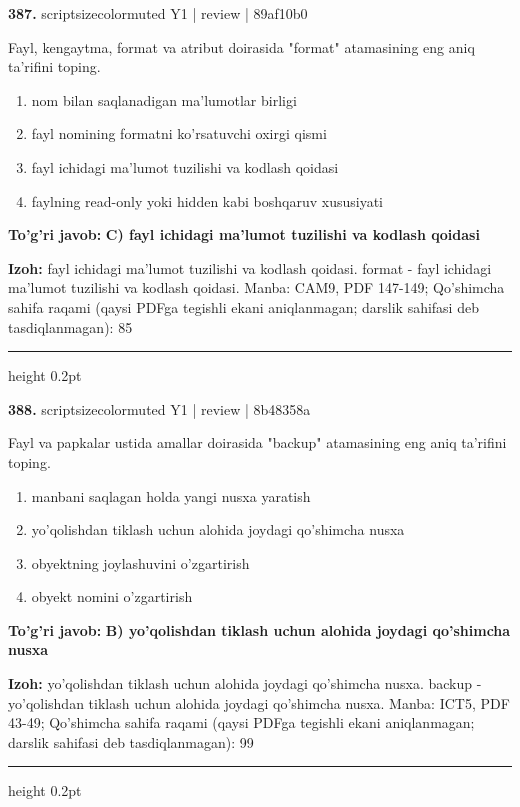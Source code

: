 \documentclass[10pt,a4paper]{article}
\begin{document}
{\bfseries\sffamily\color{ink} 387.} {scriptsizecolor{muted} Y1 | review | 89af10b0}
\par
Fayl, kengaytma, format va atribut doirasida "format" atamasining eng aniq ta'rifini toping.
\begin{enumerate}[label=\Alph*),leftmargin=9mm]
\item nom bilan saqlanadigan ma'lumotlar birligi
\item fayl nomining formatni ko'rsatuvchi oxirgi qismi
\item fayl ichidagi ma'lumot tuzilishi va kodlash qoidasi
\item faylning read-only yoki hidden kabi boshqaruv xususiyati
\end{enumerate}
\begin{tcolorbox}[enhanced,breakable,colback=teal!4,colframe=teal!60!black,boxrule=0.45pt,arc=1.2mm,left=2.7mm,right=2.7mm,top=1.8mm,bottom=1.8mm,before skip=2mm,after skip=2mm]
{\bfseries\sffamily\color{teal}To'g'ri javob:} \textbf{C) fayl ichidagi ma'lumot tuzilishi va kodlash qoidasi}
\par\smallskip
{\bfseries Izoh:} fayl ichidagi ma'lumot tuzilishi va kodlash qoidasi. format - fayl ichidagi ma'lumot tuzilishi va kodlash qoidasi. Manba: CAM9, PDF 147-149; Qo'shimcha sahifa raqami (qaysi PDFga tegishli ekani aniqlanmagan; darslik sahifasi deb tasdiqlanmagan): 85
\end{tcolorbox}
\vspace{2mm}\hrule height 0.2pt\vspace{3mm}

{\bfseries\sffamily\color{ink} 388.} {scriptsizecolor{muted} Y1 | review | 8b48358a}
\par
Fayl va papkalar ustida amallar doirasida "backup" atamasining eng aniq ta'rifini toping.
\begin{enumerate}[label=\Alph*),leftmargin=9mm]
\item manbani saqlagan holda yangi nusxa yaratish
\item yo'qolishdan tiklash uchun alohida joydagi qo'shimcha nusxa
\item obyektning joylashuvini o'zgartirish
\item obyekt nomini o'zgartirish
\end{enumerate}
\begin{tcolorbox}[enhanced,breakable,colback=teal!4,colframe=teal!60!black,boxrule=0.45pt,arc=1.2mm,left=2.7mm,right=2.7mm,top=1.8mm,bottom=1.8mm,before skip=2mm,after skip=2mm]
{\bfseries\sffamily\color{teal}To'g'ri javob:} \textbf{B) yo'qolishdan tiklash uchun alohida joydagi qo'shimcha nusxa}
\par\smallskip
{\bfseries Izoh:} yo'qolishdan tiklash uchun alohida joydagi qo'shimcha nusxa. backup - yo'qolishdan tiklash uchun alohida joydagi qo'shimcha nusxa. Manba: ICT5, PDF 43-49; Qo'shimcha sahifa raqami (qaysi PDFga tegishli ekani aniqlanmagan; darslik sahifasi deb tasdiqlanmagan): 99
\end{tcolorbox}
\vspace{2mm}\hrule height 0.2pt\vspace{3mm}
\end{document}
